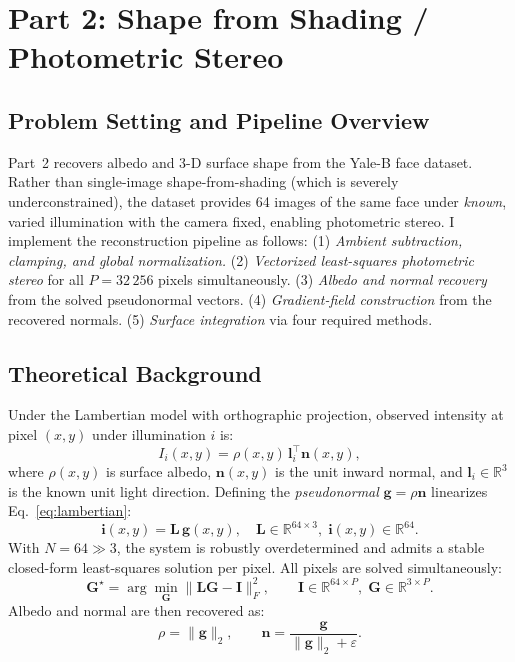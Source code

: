{\clearpage
\section*{Part 2: Shape from Shading / Photometric Stereo}

\subsection*{Problem Setting and Pipeline Overview}
Part~2 recovers albedo and 3-D surface shape from the Yale-B face dataset.
Rather than single-image shape-from-shading (which is severely underconstrained),
the dataset provides 64 images of the same face under \emph{known}, varied
illumination with the camera fixed, enabling photometric stereo.  I implement
the reconstruction pipeline as follows:
(1) \emph{Ambient subtraction, clamping, and global normalization.}
(2) \emph{Vectorized least-squares photometric stereo} for all $P = 32\,256$
pixels simultaneously.
(3) \emph{Albedo and normal recovery} from the solved pseudonormal vectors.
(4) \emph{Gradient-field construction} from the recovered normals.
(5) \emph{Surface integration} via four required methods.

\subsection*{Theoretical Background}

Under the Lambertian model with orthographic projection, observed intensity at
pixel $(x,y)$ under illumination $i$ is:
\begin{equation}
  I_i(x,y) = \rho(x,y)\,\mathbf{l}_i^\top \mathbf{n}(x,y),
  \label{eq:lambertian}
\end{equation}
where $\rho(x,y)$ is surface albedo, $\mathbf{n}(x,y)$ is the unit inward
normal, and $\mathbf{l}_i \in \mathbb{R}^3$ is the known unit light direction.
Defining the \emph{pseudonormal} $\mathbf{g} = \rho\mathbf{n}$ linearizes
Eq.~\eqref{eq:lambertian}:
\begin{equation}
  \mathbf{i}(x,y) = \mathbf{L}\,\mathbf{g}(x,y),
  \quad
  \mathbf{L} \in \mathbb{R}^{64 \times 3},\;
  \mathbf{i}(x,y) \in \mathbb{R}^{64}.
  \label{eq:photometric_system}
\end{equation}
With $N = 64 \gg 3$, the system is robustly overdetermined and admits a stable
closed-form least-squares solution per pixel.  All pixels are solved simultaneously:
\begin{equation}
  \mathbf{G}^\star = \arg\min_{\mathbf{G}} \|\mathbf{L}\mathbf{G} - \mathbf{I}\|_F^2,
  \qquad \mathbf{I} \in \mathbb{R}^{64 \times P},\; \mathbf{G} \in \mathbb{R}^{3 \times P}.
  \label{eq:batch_lstsq}
\end{equation}
Albedo and normal are then recovered as:
\begin{equation}
  \rho = \|\mathbf{g}\|_2, \qquad
  \mathbf{n} = \frac{\mathbf{g}}{\|\mathbf{g}\|_2 + \varepsilon}.
  \label{eq:albedo_normal}
\end{equation}

}
